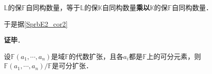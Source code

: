 $\mathbb{L}$的保$\mathbb{F}$自同构数量，等于$\mathbb{L}$的保$\mathbb{K}$自同构数量\textbf{乘以}$\mathbb{K}$的保$\mathbb{F}$自同构数量．

于是据\autoref{SprbE2_cor2} 




\textbf{证毕}．





\begin{corollary}{}
设$\mathbb{F}(a_1, \cdots, a_n)$是域$\mathbb{F}$的代数扩张，且各$a_i$都是$\mathbb{F}$上的可分元素，则$\mathbb{F}(a_1, \cdots, a_n)/\mathbb{F}$是可分扩张．
\end{corollary}




















